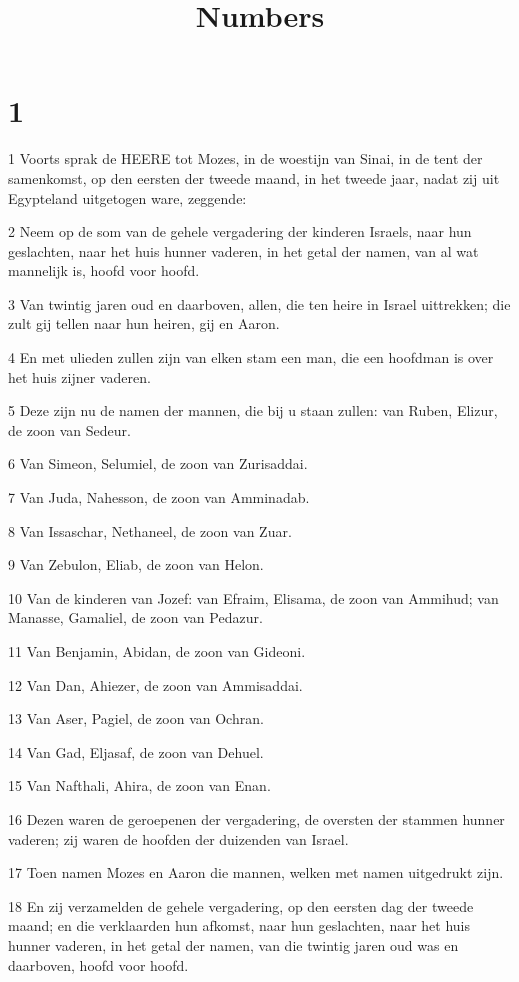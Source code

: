 

\title{Numbers}



\chapter{1}

\par 1 Voorts sprak de HEERE tot Mozes, in de woestijn van Sinai, in de tent der samenkomst, op den eersten der tweede maand, in het tweede jaar, nadat zij uit Egypteland uitgetogen ware, zeggende:
\par 2 Neem op de som van de gehele vergadering der kinderen Israels, naar hun geslachten, naar het huis hunner vaderen, in het getal der namen, van al wat mannelijk is, hoofd voor hoofd.
\par 3 Van twintig jaren oud en daarboven, allen, die ten heire in Israel uittrekken; die zult gij tellen naar hun heiren, gij en Aaron.
\par 4 En met ulieden zullen zijn van elken stam een man, die een hoofdman is over het huis zijner vaderen.
\par 5 Deze zijn nu de namen der mannen, die bij u staan zullen: van Ruben, Elizur, de zoon van Sedeur.
\par 6 Van Simeon, Selumiel, de zoon van Zurisaddai.
\par 7 Van Juda, Nahesson, de zoon van Amminadab.
\par 8 Van Issaschar, Nethaneel, de zoon van Zuar.
\par 9 Van Zebulon, Eliab, de zoon van Helon.
\par 10 Van de kinderen van Jozef: van Efraim, Elisama, de zoon van Ammihud; van Manasse, Gamaliel, de zoon van Pedazur.
\par 11 Van Benjamin, Abidan, de zoon van Gideoni.
\par 12 Van Dan, Ahiezer, de zoon van Ammisaddai.
\par 13 Van Aser, Pagiel, de zoon van Ochran.
\par 14 Van Gad, Eljasaf, de zoon van Dehuel.
\par 15 Van Nafthali, Ahira, de zoon van Enan.
\par 16 Dezen waren de geroepenen der vergadering, de oversten der stammen hunner vaderen; zij waren de hoofden der duizenden van Israel.
\par 17 Toen namen Mozes en Aaron die mannen, welken met namen uitgedrukt zijn.
\par 18 En zij verzamelden de gehele vergadering, op den eersten dag der tweede maand; en die verklaarden hun afkomst, naar hun geslachten, naar het huis hunner vaderen, in het getal der namen, van die twintig jaren oud was en daarboven, hoofd voor hoofd.
